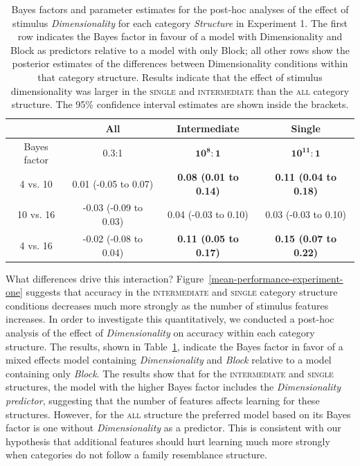 \documentclass[a4paper, doc, floatsintext]{apa6}
\begin{document}
\begin{table}[t]
\centering
\label{my-label}
\begin{tabular}{cccc}
\toprule
 & All                          & Intermediate                   & Single                           \\ \midrule
Bayes factor       & 0.3:1                             & $\mathbf{10^{8}:1}$                     & $\mathbf{10^{11}:1}$                     \\
4 vs. 10           & 0.01 (-0.05 to 0.07)    & \textbf{0.08 (0.01 to 0.14)}  & \textbf{0.11 (0.04 to 0.18)}  \\
10 vs. 16          & -0.03 (-0.09 to 0.03) & 0.04 (-0.03 to 0.10) & 0.03 (-0.03 to 0.10) \\
4 vs. 16           & -0.02 (-0.08 to 0.04)  & \textbf{0.11 (0.05 to 0.17)} & \textbf{0.15 (0.07 to 0.22)} \\ \bottomrule
\end{tabular}
\vspace{2mm}
\caption{\small{Bayes factors and parameter estimates for the post-hoc analyses of the effect of stimulus \textit{Dimensionality} for each category \textit{Structure} in Experiment 1. The first row indicates the Bayes factor in favour of a model with Dimensionality and Block as predictors relative to a model with only Block; all other rows show the posterior estimates of the differences between Dimensionality conditions within that category structure. Results indicate that the effect of stimulus dimensionality was larger in the \textsc{single} and \textsc{intermediate} than the \textsc{all} category structure. The 95\% confidence interval estimates are shown inside the brackets.}}
\label{exp1-post-hoc-table}
\end{table}

What differences drive this interaction? Figure~\ref{mean-performance-experiment-one} suggests that accuracy in the \textsc{intermediate} and \textsc{single} category structure conditions decreases much more strongly as the number of stimulus features increases. In order to investigate this quantitatively, we conducted a post-hoc analysis of the effect of \textit{Dimensionality} on accuracy within each category structure. The results, shown in Table~\ref{exp1-post-hoc-table}, indicate the Bayes factor in favor of a mixed effects model containing \textit{Dimensionality} and \textit{Block} relative to a model containing only \textit{Block}. The results show that for the \textsc{intermediate} and \textsc{single} structures, the model with the higher Bayes factor includes the \textit{Dimensionality predictor}, suggesting that the number of features affects learning for these structures. However, for the \textsc{all} structure the preferred model based on its Bayes factor is one without \textit{Dimensionality} as a predictor. This is consistent with our hypothesis that additional features should hurt learning much more strongly when categories do not follow a family resemblance structure.
\end{document}
